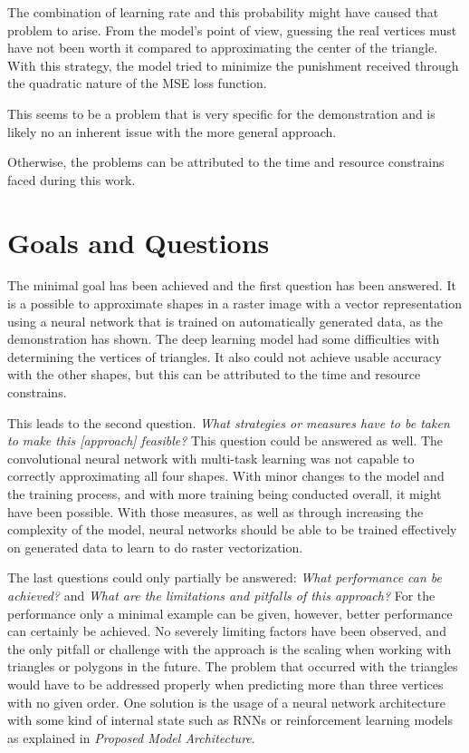\documentclass[12pt, a4paper, titlepage]{report}
\begin{document}
The combination of learning rate and this probability might have caused that problem to arise. From the model's point of view, guessing the real vertices must have not been worth it compared to approximating the center of the triangle. With this strategy, the model tried to minimize the punishment received through the quadratic nature of the MSE loss function.

This seems to be a problem that is very specific for the demonstration and is likely no an inherent issue with the more general approach.

Otherwise, the problems can be attributed to the time and resource constrains faced during this work.

\section{Goals and Questions}

The minimal goal has been achieved and the first question has been answered. It is a possible to approximate shapes in a raster image with a vector representation using a neural network that is trained on automatically generated data, as the demonstration has shown. The deep learning model had some difficulties with determining the vertices of triangles. It also could not achieve usable accuracy with the other shapes, but this can be attributed to the time and resource constrains.

This leads to the second question. \emph{What strategies or measures have to be taken to make this [approach] feasible?}
This question could be answered as well. The convolutional neural network with multi-task learning was not capable to correctly approximating all four shapes. With minor changes to the model and the training process, and with more training being conducted overall, it might have been possible. With those measures, as well as through increasing the complexity of the model, neural networks should be able to be trained effectively on generated data to learn to do raster vectorization.

The last questions could only partially be answered: \emph{What performance can be achieved?} and \emph{What are the limitations and pitfalls of this approach?}
For the performance only a minimal example can be given, however, better performance can certainly be achieved. No severely limiting factors have been observed, and the only pitfall or challenge with the approach is the scaling when working with triangles or polygons in the future. The problem that occurred with the triangles would have to be addressed properly when predicting more than three vertices with no given order. One solution is the usage of a neural network architecture with some kind of internal state such as RNNs or reinforcement learning models as explained in \emph{Proposed Model Architecture}.
\end{document}
